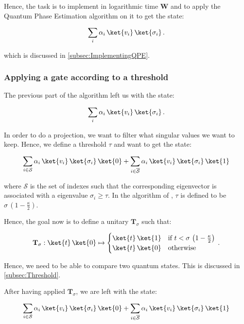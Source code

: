 \documentclass[11pt, a4paper]{article}
\begin{document}
                Hence, the task is to implement in logarithmic time \(\mathbf{W}\) and to apply the Quantum Phase Estimation algorithm on it to get the state:
                
                \[\sum_{i}\alpha_i\,\ket{v_i}\,\ket{\sigma_i}\,.\]
                
                which is discussed in \autoref{subsec:ImplementingQPE}.
            \subsubsection{Applying a gate according to a threshold}
                The previous part of the algorithm left us with the state:
                
                \[\sum_{i}\alpha_i\,\ket{v_i}\,\ket{\sigma_i}\,.\]
                
                In order to do a projection, we want to filter what singular values we want to keep. Hence, we define a threshold \(\tau\) and want to get the state:
                
                \[\sum_{i\in\mathcal{S}}\alpha_i\,\ket{v_i}\,\ket{\sigma_i}\,\ket{0} + \sum_{i\in\overline{\mathcal{S}}}\alpha_i\,\ket{v_i}\,\ket{\sigma_i}\,\ket{1}\]
                
                where \(\mathcal{S}\) is the set of indexes such that the corresponding eigenvector is associated with a eigenvalue \(\sigma_i\geqslant\tau\). In the algorithm of \citeauthor{QRS}, \(\tau\) is defined to be \(\sigma\,\left(1-\frac\kappa2\right)\).
                
                Hence, the goal now is to define a unitary \(\mathbf{T}_\sigma\) such that:
                
                \[\mathbf{T}_\sigma:\ket{t}\,\ket{0}\mapsto\begin{cases}\ket{t}\,\ket{1} &\text{if } t < \sigma\,\left(1-\frac\kappa2\right)\\\ket{t}\,\ket{0}&\text{otherwise}\end{cases}\,.\]
                
                Hence, we need to be able to compare two quantum states. This is discussed in \autoref{subsec:Threshold}.
                
                After having applied \(\mathbf{T}_\sigma\), we are left with the state:
                
                \[\sum_{i\in\mathcal{S}}\alpha_i\,\ket{v_i}\,\ket{\sigma_i}\,\ket{0} + \sum_{i\in\overline{\mathcal{S}}}\alpha_i\,\ket{v_i}\,\ket{\sigma_i}\,\ket{1}\]
                
\end{document}
